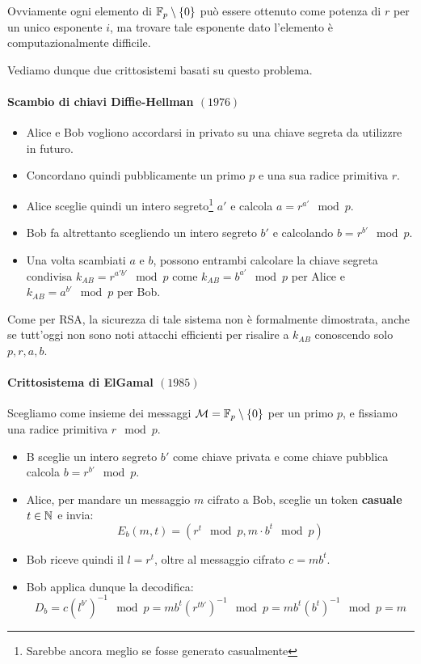 Ovviamente ogni elemento di \(\mathbb{F}_p\setminus\set{0}\) può essere ottenuto come potenza di \(r\) per un unico esponente \(i\), ma trovare tale esponente dato l'elemento è computazionalmente difficile.

Vediamo dunque due crittosistemi basati su questo problema.

\paragraph{Scambio di chiavi Diffie-Hellman \((1976)\)}
\begin{itemize}
  \item Alice e Bob vogliono accordarsi in privato su una chiave segreta da utilizzre in futuro.
  \item Concordano quindi pubblicamente un primo \(p\) e una sua radice primitiva \(r\).
  \item Alice sceglie quindi un intero segreto\footnote{Sarebbe ancora meglio se fosse generato casualmente} \(a'\) e calcola \(a = r^{a'} \mod p\).
  \item Bob fa altrettanto scegliendo un intero segreto \(b'\) e calcolando \(b = r^{b'} \mod p\).
  \item Una volta scambiati \(a\) e \(b\), possono entrambi calcolare la chiave segreta condivisa \(k_{AB} = r^{a' b'} \mod p\) come \(k_{AB} = b^{a'} \mod p\) per Alice e \(k_{AB} = a^{b'} \mod p\) per Bob.
\end{itemize}

Come per RSA, la sicurezza di tale sistema non è formalmente dimostrata, anche se tutt'oggi non sono noti attacchi efficienti per risalire a \(k_{AB}\) conoscendo solo \(p, r, a, b\).

\paragraph{Crittosistema di ElGamal \((1985)\)}

Scegliamo come insieme dei messaggi \(\mathcal{M} = \mathbb{F}_p\setminus\set{0}\) per un primo \(p\), e fissiamo una radice primitiva \(r \mod p\).
\begin{itemize}
  \item B sceglie un intero segreto \(b'\) come chiave privata e come chiave pubblica calcola \(b = r^{b'} \mod p\).
  \item Alice, per mandare un messaggio \(m\) cifrato a Bob, sceglie un token \textbf{casuale} \(t\in\mathbb{N}\) e invia:
    \[E_b(m,t) = (r^t \mod p, m \cdot b^t \mod p)\]
  \item Bob riceve quindi il  \(l = r^t\), oltre al messaggio cifrato \(c=mb^t\).
  \item Bob applica dunque la decodifica:
    \[D_b = c {(l^{b'})}^{-1} \mod p = m b^t {(r^{t b'})}^{-1} \mod p = m b^t {(b^t)}^{-1} \mod p = m\]
\end{itemize}
